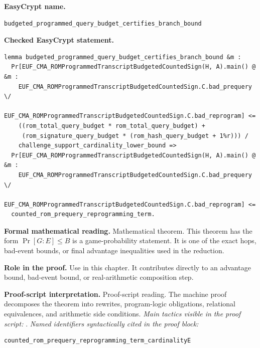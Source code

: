 \begin{formaltheorem}
\noindent\textbf{EasyCrypt name.}
\begin{lstlisting}[language=EasyCrypt,basicstyle=\ttfamily\scriptsize]
budgeted_programmed_query_budget_certifies_branch_bound
\end{lstlisting}
\noindent\textbf{Checked EasyCrypt statement.}
\begin{lstlisting}[language=EasyCrypt,basicstyle=\ttfamily\scriptsize]
lemma budgeted_programmed_query_budget_certifies_branch_bound &m :
  Pr[EUF_CMA_ROMProgrammedTranscriptBudgetedCountedSign(H, A).main() @ &m :
    EUF_CMA_ROMProgrammedTranscriptBudgetedCountedSign.C.bad_prequery \/
    EUF_CMA_ROMProgrammedTranscriptBudgetedCountedSign.C.bad_reprogram] <=
    ((rom_total_query_budget * rom_total_query_budget) +
     (rom_signature_query_budget * (rom_hash_query_budget + 1%r))) /
    challenge_support_cardinality_lower_bound =>
  Pr[EUF_CMA_ROMProgrammedTranscriptBudgetedCountedSign(H, A).main() @ &m :
    EUF_CMA_ROMProgrammedTranscriptBudgetedCountedSign.C.bad_prequery \/
    EUF_CMA_ROMProgrammedTranscriptBudgetedCountedSign.C.bad_reprogram] <=
  counted_rom_prequery_reprogramming_term.
\end{lstlisting}
\noindent\textbf{Formal mathematical reading.}
Mathematical theorem. This theorem has the form \(\Pr[G:E] \le B\) is a game-probability statement.  It is one of the exact hops, bad-event bounds, or final advantage inequalities used in the reduction.

\noindent\textbf{Role in the proof.}
Use in this chapter. It contributes directly to an advantage bound, bad-event bound, or real-arithmetic composition step.

\noindent\textbf{Proof-script interpretation.}
Proof-script reading. The machine proof decomposes the theorem into rewrites, program-logic obligations, relational equivalences, and arithmetic side conditions.
\emph{Main tactics visible in the proof script:} .
\emph{Named identifiers syntactically cited in the proof block:}
\begin{lstlisting}[language=EasyCrypt,basicstyle=\ttfamily\scriptsize]
counted_rom_prequery_reprogramming_term_cardinalityE
\end{lstlisting}

\end{formaltheorem}

